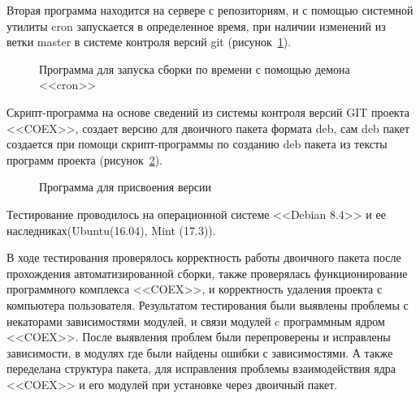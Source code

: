 Вторая программа находится на сервере с репозиториям, и с помощью системной утилиты cron запускается в определенное время, при наличии изменений из ветки master в системе контроля версий git (рисунок~\ref{ser_2:ser_2}).

\begin{figure}[h!]
\caption{ Программа  для запуска сборки по времени  с помощью демона <<cron>> }
\label{ser_2:ser_2}
\end{figure}

Скрипт-программа на основе сведений из системы контроля версий GIT проекта <<COEX>>, создает версию для двоичного пакета формата deb, сам deb пакет создается при помощи скрипт-программы по созданию  deb пакета из тексты программ проекта (рисунок~\ref{ser_3:ser_3}).

\begin{figure}[h!]
\caption{ Программа для присвоения версии }
\label{ser_3:ser_3}
\end{figure}

Тестирование проводилось на операционной системе <<Debian 8.4>> и ее наследниках(Ubuntu(16.04), Mint (17.3)).

В ходе тестирования проверялось корректность работы двоичного пакета после прохождения автоматизированной сборки, также проверялась функционирование программного комплекса <<COEX>>, и корректность удаления проекта с компьютера пользователя. Результатом тестирования были выявлены проблемы с некаторами зависимостями модулей, и связи модулей c программным ядром <<COEX>>. После выявления проблем были перепроверены и исправлены зависимости, в модулях где были найдены ошибки с зависимостями. А также переделана структура пакета, для исправления проблемы взаимодействия ядра <<COEX>> и его модулей при установке через двоичный пакет.  

\clearpage
